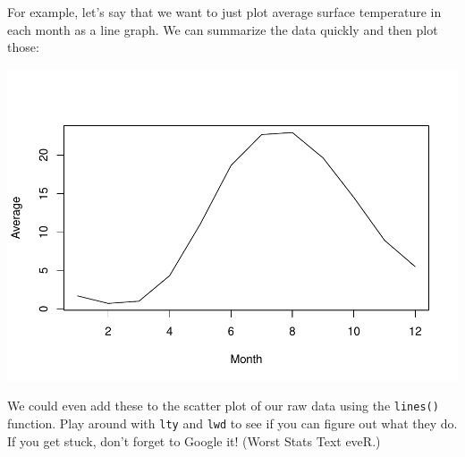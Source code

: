 \documentclass[
]{book}
\newenvironment{Shaded}{\begin{snugshade}}{\end{snugshade}}
\newcommand{\DataTypeTok}[1]{\textcolor[rgb]{0.13,0.29,0.53}{#1}}
\newcommand{\KeywordTok}[1]{\textcolor[rgb]{0.13,0.29,0.53}{\textbf{#1}}}
\newcommand{\NormalTok}[1]{#1}
\newcommand{\OperatorTok}[1]{\textcolor[rgb]{0.81,0.36,0.00}{\textbf{#1}}}
\newcommand{\StringTok}[1]{\textcolor[rgb]{0.31,0.60,0.02}{#1}}
\begin{document}
For example, let's say that we want to just plot average surface temperature in each month as a line graph. We can summarize the data quickly and then plot those:

\begin{Shaded}
\end{Shaded}

\includegraphics{worstr_files/figure-latex/unnamed-chunk-94-1.pdf}

We could even add these to the scatter plot of our raw data using the \texttt{lines()} function. Play around with \texttt{lty} and \texttt{lwd} to see if you can figure out what they do. If you get stuck, don't forget to Google it! (Worst Stats Text eveR.)
\end{document}
